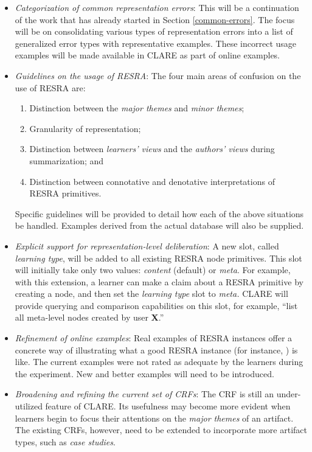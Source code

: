 \begin{itemize}
\item {\it Categorization of common representation errors}: This will
  be a continuation of the work that has already started in Section
  \ref{common-errors}. The focus will be on consolidating various types
  of representation errors into a list of generalized error types with
  representative examples. These incorrect usage examples will be made
  available in CLARE as part of online examples.
  
\item {\it Guidelines on the usage of RESRA}: The four main areas of
  confusion on the use of RESRA are:

  \begin{enumerate}
  \item Distinction between the {\it major themes\/} and {\it minor themes\/};
    
  \item Granularity of representation;
    
  \item Distinction between {\it learners' views\/} and the {\it authors'
    views\/} during summarization; and
    
  \item Distinction between connotative and denotative interpretations
    of RESRA primitives. 
\end{enumerate}
  
Specific guidelines will be provided to detail how each of the above
situations be handled. Examples derived from the actual database will
also be supplied.
  
\item {\it Explicit support for representation-level deliberation\/}: A
  new slot, called {\it learning type\/}, will be added to all existing
  RESRA node primitives. This slot will initially take only two values:
  {\it content\/} (default) or {\it meta\/}. For example, with this
  extension, a learner can make a claim about a RESRA primitive by
  creating a  node, and then set the {\it learning
  type\/} slot to {\it meta.\/} CLARE will provide querying and
  comparison capabilities on this slot, for example, ``list all
  meta-level  nodes created by user {\bf X}.''
  
\item {\it Refinement of online examples}: Real examples of RESRA
  instances offer a concrete way of illustrating what a good RESRA instance
  (for instance, ) is like. The current examples were
  not rated as adequate by the learners during the experiment. New and
  better examples will need to be introduced.
  
\item {\it Broadening and refining the current set of CRFs}: The CRF is
  still an under-utilized feature of CLARE. Its usefulness may become more
  evident when learners begin to focus their attentions on the {\it major
  themes\/} of an artifact. The existing CRFs, however, need to be extended
  to incorporate more artifact types, such as {\it case studies\/}.
\end{itemize}


